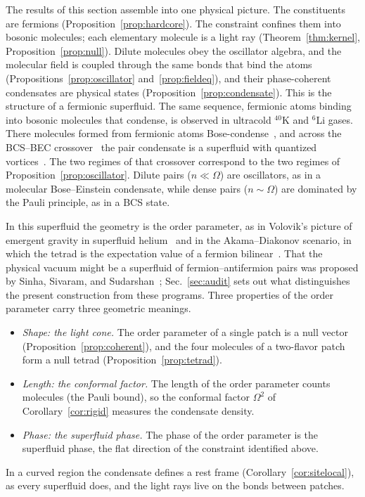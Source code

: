 \documentclass[reprint,aps,prd,amsmath,amssymb,superscriptaddress,nofootinbib,floatfix]{revtex4-2}
\theoremstyle{plain}
\theoremstyle{definition}
\theoremstyle{remark}
\begin{document}
The results of this section assemble into one physical picture. The constituents are fermions
(Proposition~\ref{prop:hardcore}). The constraint confines them into bosonic molecules; each elementary molecule is a light
ray (Theorem~\ref{thm:kernel}, Proposition~\ref{prop:null}). Dilute molecules obey the oscillator algebra, and the molecular field is coupled through the same
bonds that bind the atoms (Propositions~\ref{prop:oscillator} and~\ref{prop:fieldeq}), and their phase-coherent condensates are
physical states (Proposition~\ref{prop:condensate}). This is the structure of a fermionic superfluid. The same sequence,
fermionic atoms binding into bosonic molecules that condense, is observed in ultracold $^{40}$K and $^6$Li gases. There
molecules formed from fermionic atoms Bose-condense~\cite{Greiner2003}, and across the BCS--BEC
crossover~\cite{Leggett1980,NozieresSchmittRink1985} the pair condensate is a superfluid with quantized
vortices~\cite{Zwierlein2005}. The two regimes of that crossover correspond to the two regimes of
Proposition~\ref{prop:oscillator}. Dilute pairs ($n\ll\Omega$) are oscillators, as in a molecular Bose--Einstein condensate,
while dense pairs ($n\sim\Omega$) are dominated by the Pauli principle, as in a BCS state.

In this superfluid the geometry is the order parameter, as in Volovik's picture of emergent gravity in superfluid
helium~\cite{Volovik2009} and in the Akama--Diakonov scenario, in which the tetrad is the expectation value of a fermion
bilinear~\cite{Akama1978,Diakonov2011,Volovik2022}. That the physical vacuum might be a superfluid of fermion--antifermion
pairs was proposed by Sinha, Sivaram, and Sudarshan~\cite{SinhaSivaramSudarshan1976}; Sec.~\ref{sec:audit} sets out what
distinguishes the present construction from these programs. Three properties of the order parameter carry three geometric meanings.
\begin{itemize}
\item \emph{Shape: the light cone.} The order parameter of a single patch is a null vector
(Proposition~\ref{prop:coherent}), and the four molecules of a two-flavor patch form a null tetrad
(Proposition~\ref{prop:tetrad}).
\item \emph{Length: the conformal factor.} The length of the order parameter counts molecules (the Pauli bound), so the
conformal factor $\Omega^2$ of Corollary~\ref{cor:rigid} measures the condensate density.
\item \emph{Phase: the superfluid phase.} The phase of the order parameter is the superfluid phase, the flat direction
of the constraint identified above.
\end{itemize}
In a curved region the condensate defines a rest frame (Corollary~\ref{cor:sitelocal}), as every superfluid does, and the
light rays live on the bonds between patches.
\end{document}
